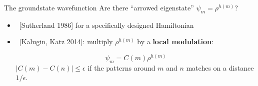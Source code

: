 \documentclass[xcolor=x11names,compress,professionalfonts, aspectratio=169]{beamer}
\renewcommand{\(}{\begin{columns}}
\renewcommand{\)}{\end{columns}}
\newcommand{\<}[1]{\begin{column}{#1}}
\renewcommand{\>}{\end{column}}
\begin{document}
\begin{frame}{The groundstate wavefunction}
Are there ``arrowed eigenstate'' $\psi_m = \rho^{h(m)}$?
\begin{itemize}
\item ~[Sutherland 1986] for a specifically designed Hamiltonian
%

\item ~[Kalugin, Katz 2014]: multiply $\rho^{h(m)}$ by a \textbf{local modulation}:

\[
	\psi_m = C(m) \rho^{h(m)}
\]
$|C(m) - C(n)| \leq \epsilon$ if the patterns around $m$ and $n$ matches on a distance $1/\epsilon$.
\end{itemize}

\newcommand{\s}{.11}
{

\centering

}
\end{frame}
\end{document}
